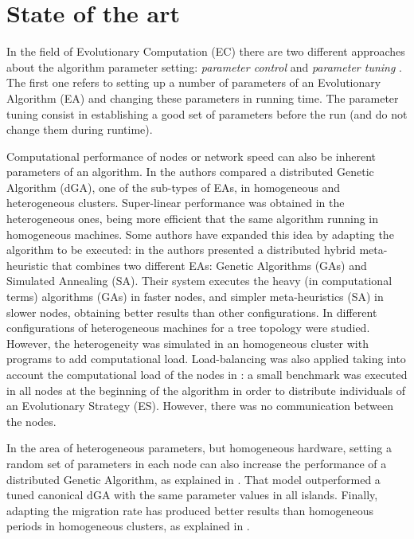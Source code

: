 %
\section{State of the art}
\label{sec:soa}
%

In the field of  Evolutionary Computation (EC) there are two different approaches about the algorithm parameter setting: {\em parameter control} and {\em parameter tuning} \cite{PARAMETERTUNING}. The first one refers to setting up a number of parameters of an Evolutionary Algorithm (EA) and changing these parameters in running time. The parameter tuning consist in establishing a good set of parameters before the run (and do not change them during runtime).

 Computational performance of nodes or network speed can also be inherent parameters of an algorithm. In \cite{HETEROGENEOUSHARD} the authors compared a distributed Genetic Algorithm (dGA), one of the sub-types of EAs, in homogeneous and heterogeneous clusters. Super-linear performance was obtained in the heterogeneous ones, being more efficient that the same algorithm running in homogeneous machines. Some authors have expanded this idea by adapting the algorithm to be executed: in \cite{HYDROCM} the authors presented a distributed hybrid meta-heuristic that combines two different EAs: Genetic Algorithms (GAs) and Simulated Annealing (SA). Their system executes the heavy (in computational terms) algorithms (GAs) in faster nodes, and simpler meta-heuristics (SA) in slower nodes, obtaining better results than other configurations. In \cite{HETEROGENEOUSTOPOLOGY} different configurations of heterogeneous machines for a tree topology were studied. However, the heterogeneity was simulated in an homogeneous cluster with programs to add computational load. Load-balancing was also applied taking into account the computational load of the nodes in \cite{PARALLELIMPLEMENTATION}: a small benchmark was executed in all nodes at the beginning of the algorithm in order to distribute individuals of an Evolutionary Strategy (ES). However, there was no communication between the nodes. 

In the area of heterogeneous parameters, but homogeneous hardware, setting a random set of parameters in each node can also increase the performance of a distributed Genetic Algorithm, as explained in \cite{HETEROGENEOUSPARAMETERS}. That model outperformed a tuned canonical dGA with the same parameter values in all islands. Finally, adapting the migration rate has produced better results than homogeneous periods in homogeneous clusters, as explained in \cite{HETEROGENEOUSMIGRATION}.

